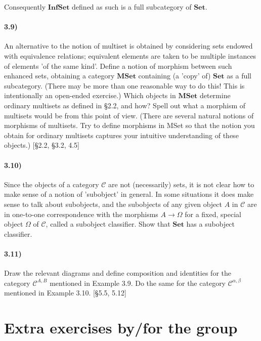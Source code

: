 \documentclass[12pt, letterpaper, twoside]{report}
\begin{document}
Consequently $\mathbf{InfSet}$ defined as such is a full subcategory of $\mathbf{Set}$.


\subsection*{3.9)}

An alternative to the notion of multiset is obtained by considering sets endowed with equivalence relations; equivalent elements are taken to be multiple instances of elements 'of the same kind'. Define a notion of morphism between such enhanced sets, obtaining a category $\mathbf{MSet}$ containing (a 'copy' of) $\mathbf{Set}$ as a full subcategory. (There may be more than one reasonable way to do this! This is intentionally an open-ended exercise.) Which objects in $\mathbf{MSet}$ determine ordinary multisets as defined in §2.2, and how? Spell out what a morphism of multisets would be from this point of view. (There are several natural notions of morphisms of multisets. Try to define morphisms in MSet so that the notion you obtain for ordinary multisets captures your intuitive understanding of these objects.) [§2.2, §3.2, 4.5]


\subsection*{3.10)}

Since the objects of a category $\mathcal{C}$ are not (necessarily) sets, it is not clear how to make sense of a notion of 'subobject' in general. In some situations it does make sense to talk about subobjects, and the subobjects of any given object $A$ in $\mathcal{C}$ are in one-to-one correspondence with the morphisms $A \to \Omega$ for a fixed, special object $\Omega$ of $\mathcal{C}$, called a subobject classifier. Show that $\mathbf{Set}$ has a subobject classifier.


\subsection*{3.11)}

Draw the relevant diagrams and define composition and identities for the category $\mathcal{C}^{A,B}$ mentioned in Example 3.9. Do the same for the category $\mathcal{C}^{\alpha, \beta}$ mentioned in Example 3.10. [§5.5, 5.12]
\newpage
\part{Extra exercises by/for the group}
\end{document}
